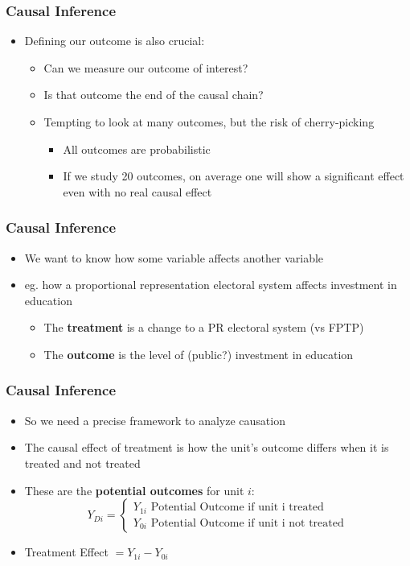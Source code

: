 \documentclass[xcolor=x11names,compress]{beamer}\usepackage[]{graphicx}\usepackage[]{color}
\renewcommand{\(}{\begin{columns}}
\renewcommand{\)}{\end{columns}}
\newcommand{\<}[1]{\begin{column}{#1}}
\renewcommand{\>}{\end{column}}
\begin{document}
\begin{frame}
\frametitle{Causal Inference}
\begin{itemize}
\item Defining our outcome is also crucial:
\begin{itemize}
\item Can we measure our outcome of interest?
\item Is that outcome the end of the causal chain?
\item Tempting to look at many outcomes, but the risk of cherry-picking
\begin{itemize}
\item All outcomes are probabilistic
\item If we study 20 outcomes, on average one will show a significant effect even with no real causal effect
\end{itemize}
\end{itemize}
\end{itemize}
\end{frame}

\begin{frame}
\frametitle{Causal Inference}
\begin{itemize}
\item We want to know how some variable affects another variable
\item eg. how a proportional representation electoral system affects investment in education
\begin{itemize}
\item The \textbf{treatment} is a change to a PR electoral system (vs FPTP)
\item The \textbf{outcome} is the level of (public?) investment in education
\end{itemize}
\end{itemize}
\end{frame}

\begin{frame}
\frametitle{Causal Inference}
\begin{itemize}
\item So we need a precise framework to analyze causation
\item The causal effect of treatment is how the unit's outcome differs when it is treated and not treated
\item These are the \textbf{potential outcomes} for unit $i$:
\[
Y_{Di} = 
\begin{cases}
Y_{1i}\text{   Potential Outcome if unit i treated} \\
Y_{0i}\text{   Potential Outcome if unit i not treated}
\end{cases}
\]
\item Treatment Effect $ = Y_{1i} - Y_{0i}$
\end{itemize}
\end{frame}
\end{document}
